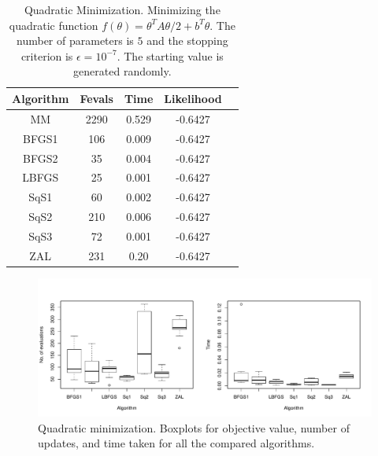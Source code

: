 \documentclass[12pt]{article}
\begin{document}
\begin{table}[!h]
\centering
\begin{tabular}{c c c c c} 
 \hline
 Algorithm & Fevals  & Time & Likelihood\\ [0.5ex] 
 \hline
 MM & 2290 & 0.529 & -0.6427\\
 BFGS1 & 106 & 0.009 & -0.6427\\
 BFGS2 & 35 & 0.004 & -0.6427\\
 LBFGS & 25 & 0.001 & -0.6427 \\
 SqS1 & 60 & 0.002 & -0.6427  \\
 SqS2 & 210 & 0.006 & -0.6427\\
 SqS3 & 72 & 0.001 & -0.6427  \\
 ZAL & 231 & 0.20 & -0.6427  \\[1ex] 
 \hline
\end{tabular}
\caption{Quadratic Minimization. Minimizing the quadratic function $f(\theta) = \theta^T A \theta/2 + b^T \theta$. The number of parameters is $5$ and the stopping criterion is $\epsilon = 10^{-7}$. The starting value is generated randomly.}
\label{tab:quadratic}
\end{table}

\begin{figure}[!htbp]
    \centering
    \includegraphics[width = \textwidth]{plots/quad-boxplot_sd1e3.pdf}
    \caption{Quadratic minimization. Boxplots for objective value, number of updates, and time taken for all the compared algorithms.}
    \label{fig:quad_boxplot}
\end{figure}



\end{document}

